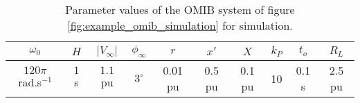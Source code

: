 \renewcommand{\arraystretch}{1.2}
\begin{table}[t]
\begin{center}
\begin{tabular}{ c|c|c|c|c|c|c|c|c|c } 
\hline 
\raisebox{-3mm}{} $\omega_0$ & $H$ & $\left\lvert V_\infty\right\rvert$ & $\phi_\infty$ & $r$ & $x'$ & $X$ & $k_P$ & $t_o$ & $R_L$\\
\hline
$120\pi$ rad.s$^{-1}$ & $1$ s & $1.1$ pu & $3^\circ$ & 0.01 pu & 0.5 pu& 0.1 pu & 10 & 0.1 s & 2.5 pu \\
\hline
\end{tabular}
\end{center}
\caption{Parameter values of the OMIB system of figure \ref{fig:example_omib_simulation} for simulation.}
\label{tab:synchmachine_params}
\end{table} %

